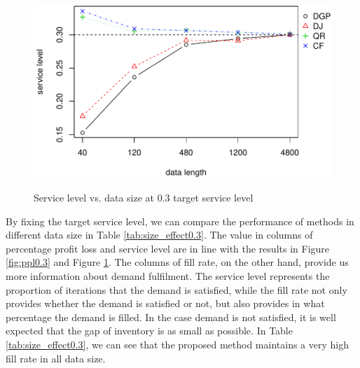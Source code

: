 \documentclass{article}
\begin{document}
\begin{figure}[ht]
\centering
\caption{Service level vs. data size at 0.3 target service level}
\includegraphics{sl-3.pdf}
\label{fig:sl0.3}
\end{figure}

By fixing the target service level, we can compare the performance of methods in different data size in Table \ref{tab:size_effect0.3}. The value in columns of percentage profit loss and service level are in line with the results in Figure \ref{fig:ppl0.3} and Figure \ref{fig:sl0.3}. The columns of fill rate, on the other hand, provide us more information about demand fulfilment. The service level represents the proportion of iterations that the demand is satisfied, while the fill rate not only provides whether the demand is satisfied or not, but also provides in what percentage the demand is filled. In the case demand is not satisfied, it is well expected that the gap of inventory is as small as possible. In Table \ref{tab:size_effect0.3}, we can see that the proposed method maintains a very high fill rate in all data size. 
\end{document}
